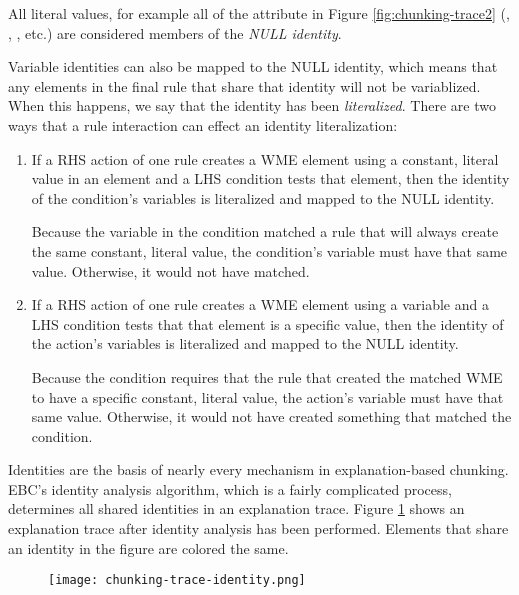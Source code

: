 All literal values, for example all of the attribute in Figure \ref{fig:chunking-trace2} (, , , etc.) are considered members of the \textit{NULL identity}.

Variable identities can also be mapped to the NULL identity, which means that any elements in the final rule that share that identity will not be variablized. When this happens, we say that the identity has been \textit{literalized}.  There are two ways that a rule interaction can effect an identity literalization:

\begin{enumerate}
	\item If a RHS action of one rule creates a WME element using a constant, literal value in an element and a LHS condition tests that element, then the identity of the condition's variables is literalized and mapped to the NULL identity.

	Because the variable in the condition matched a rule that will always create the same constant, literal value, the condition's variable must have that same value.  Otherwise, it would not have matched.


	\item If a RHS action of one rule creates a WME element using a variable and a LHS condition tests that that element is a specific value, then the identity of the action's variables is literalized and mapped to the NULL identity.

	Because the condition requires that the rule that created the matched WME to have a specific constant, literal value, the action's variable must have that same value.  Otherwise, it would not have created something that matched the condition.
\end{enumerate}

Identities are the basis of nearly every mechanism in explanation-based chunking.  EBC's identity analysis algorithm, which is a fairly complicated process, determines all shared identities in an explanation trace.  Figure \ref{fig:chunking-trace-identity} shows an explanation trace after identity analysis has been performed.  Elements that share an identity in the figure are colored the same.

\vspace{12pt}
\begin{figure}[!h]
	\centering
	\texttt{[image: chunking-trace-identity.png]}
	\label{fig:chunking-trace-identity}
\end{figure}

